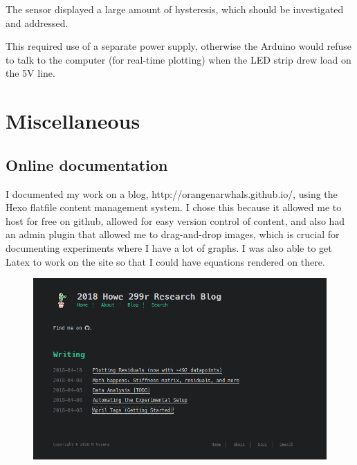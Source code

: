 \documentclass[12pt]{article}
\begin{document}
The sensor displayed a large amount of hysteresis, which should be investigated and addressed.

This required use of a separate power supply, otherwise the Arduino would refuse to talk to the
computer (for real-time plotting) when the LED strip drew load on the 5V line.

\section{Miscellaneous}

\subsection{Online documentation}
I documented my work on a blog, http://orangenarwhals.github.io/, using the Hexo flatfile content
management system. I chose this because it allowed me to host for free on github, allowed for easy
version control of content, and also had an admin plugin that allowed me to drag-and-drop images,
which is crucial for documenting experiments where I have a lot of graphs. I was also able to get
Latex to work on the site so that I could have equations rendered on there.

\begin{figure}[H]
\centering
\includegraphics[width=.8\textwidth]{images/misc/blog.png}
\end{figure}
\end{document}
